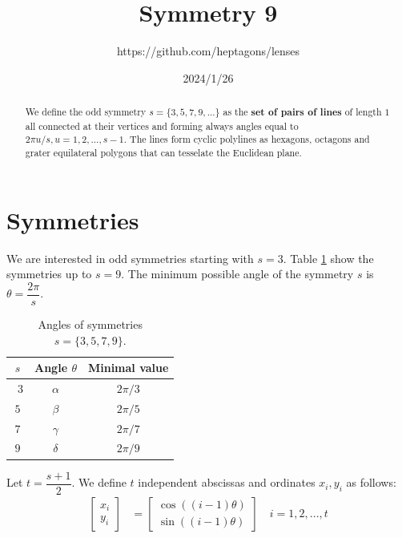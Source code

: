 \documentclass[11pt]{article}
\title{Symmetry 9}
\author{https://github.com/heptagons/lenses}
\date{2024/1/26}
\begin{document}
\maketitle
\begin{abstract}
We define the odd symmetry $s=\{ 3,5,7,9,... \}$ as the \textbf{set of pairs of lines} of length $1$ all connected at their vertices and forming always angles equal to $2\pi u/s, u = 1,2,...,s-1$. The lines form cyclic polylines as hexagons, octagons and grater equilateral polygons that can tesselate the Euclidean plane.
\end{abstract}

\section{Symmetries}

We are interested in odd symmetries starting with $s=3$. Table \ref{tbl:symm} show the symmetries up to $s=9$. The minimum possible angle of the symmetry $s$ is $\theta = \dfrac{2\pi}s$. 

\begin{table}[H]
\begin{center}
\begin{tabular}{|c|c c|}
\hline
$s$ & Angle $\theta$ & Minimal value \\ \hline\
$3$ & $\alpha$ & $2\pi/3$ \\ \hline
$5$ & $\beta$  & $2\pi/5$ \\ \hline
$7$ & $\gamma$ & $2\pi/7$ \\ \hline
$9$ & $\delta$ & $2\pi/9$ \\ \hline
\end{tabular}
\caption{Angles of symmetries $s=\{3,5,7,9\}$.} 
\label{tbl:symm}
\end{center}
\end{table}

Let $t = \dfrac{s+1}2$. We define $t$ independent abscissas and ordinates $x_i, y_i$ as follows:
\begin{align}
\left[ \begin{array}{c} x_i \\ y_i \end{array} \right] &= 
\left[ \begin{array}{c} \cos((i-1)\theta) \\ \sin((i-1)\theta) \end{array} \right]
 \quad i = 1,2,...,t \label{eq:pairs}
\end{align}
\end{document}
